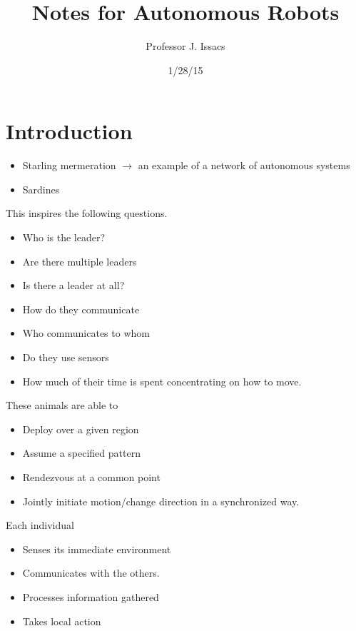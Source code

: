 \documentclass{article}
\title{Notes for Autonomous Robots}
\author{Professor J. Issacs}
\date{1/28/15}
\begin{document}
\maketitle
\section{Introduction}
\begin{itemize}
\item Starling mermeration $\rightarrow$ an example of a network of autonomous systems
\item Sardines 
\end{itemize}
This inspires the following questions.
\begin{itemize}
\item Who is the leader?
\item Are there multiple leaders
\item Is there a leader at all?
\item How do they communicate
\item Who communicates to whom
\item Do they use sensors
\item How much of their time is spent concentrating on how to move. 
\end{itemize}
These animals are able to
\begin{itemize}
\item Deploy over a given region
\item Assume a specified pattern
\item Rendezvous at a common point
\item Jointly initiate motion/change direction in a synchronized way.
\end{itemize}
Each individual
\begin{itemize}
\item Senses its immediate environment
\item Communicates with the others.
\item Processes information gathered
\item Takes local action
\end{itemize}
\end{document}

